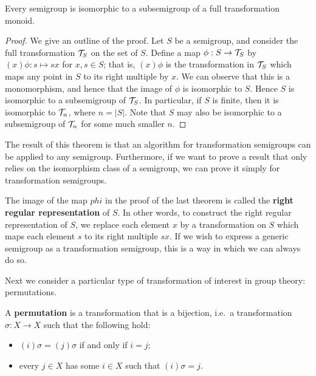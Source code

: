 \begin{theorem}
  \label{thm:cayley-semigroups}
  Every semigroup is isomorphic to a subsemigroup of a full transformation
  monoid.
  \begin{proof}
    We give an outline of the proof.  Let $S$ be a semigroup, and consider the
    full transformation $\mathcal{T}_S$ on the set of $S$.  Define a map
    $\phi: S \to \mathcal{T}_S$ by $(x)\phi: s \mapsto sx$ for $x,s \in S$; that is,
    $(x)\phi$ is the transformation in $\mathcal{T}_S$ which maps any point in $S$ to its
    right multiple by $x$.  We can observe that this is a monomorphism, and
    hence that the image of $\phi$ is isomorphic to $S$.  Hence $S$ is
    isomorphic to a subsemigroup of $\mathcal{T}_S$.  In particular, if $S$ is finite,
    then it is isomorphic to $\mathcal{T}_n$, where $n = |S|$.  Note that $S$ may also be
    isomorphic to a subsemigroup of $\mathcal{T}_n$ for some much smaller $n$.
  \end{proof}
\end{theorem}

The result of this theorem is that an algorithm for transformation semigroups
can be applied to any semigroup.  Furthermore, if we want to prove a result that
only relies on the isomorphism class of a semigroup, we can prove it simply for
transformation semigroups.

The image of the map $phi$ in the proof of the last theorem is called the
\textbf{right regular representation} of $S$.  In other words, to construct the
right regular representation of $S$, we replace each element $x$ by a
transformation on $S$ which maps each element $s$ to its right multiple $sx$.
If we wish to express a generic semigroup as a transformation semigroup, this is
a way in which we can always do so.

Next we consider a particular type of transformation of interest in group
theory: permutations.

\begin{definition}
  \label{def:permutation}
  A \textbf{permutation} is a transformation that is a bijection, i.e.~a
  transformation $\sigma: X \to X$ such that the following hold:
  \begin{itemize}
  \item $(i)\sigma=(j)\sigma$ if and only if $i=j$;
  \item every $j \in X$ has some $i \in X$ such that $(i)\sigma = j$.
  \end{itemize}
\end{definition}

